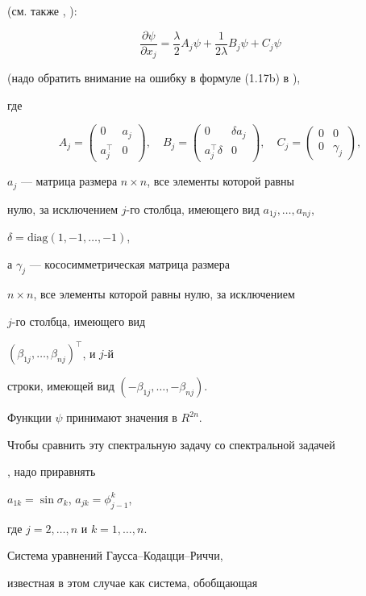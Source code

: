 \cite{ABT} (см. также \cite{Ci-space}, \cite{FP}):


$$


\frac{\partial\psi}{\partial x_j} = \frac{\lambda}{2} A_j \psi


+ \frac{1}{2\lambda} B_j \psi + C_j \psi 


$$


(надо обратить внимание на ошибку в формуле (1.17b) в \cite{ABT}),


где 


$$


A_j = \begin{pmatrix} 0 & a_j \\ a_j^\top & 0 \end{pmatrix}, \quad 


B_j = \begin{pmatrix} 0 & \delta a_j \\ a_j^\top \delta & 0 \end{pmatrix}, \quad


C_j = \begin{pmatrix} 0 & 0 \\ 0 & \gamma_j \end{pmatrix},


$$


$a_j$ --- матрица размера $n\times n$, все элементы которой равны


нулю, за исключением $j$-го столбца, имеющего вид $a_{1j},\dotsc,a_{nj}$,


$\delta = \mathrm{diag}(1,-1,\dotsc,-1)$,


а $\gamma_j$ --- кососимметрическая матрица размера


$n\times n$, все элементы которой равны нулю, за исключением


$j$-го столбца, имеющего вид


$(\beta_{1j},\dotsc,\beta_{nj})^\top$, и $j$-й


строки, имеющей вид $(-\beta_{1j},\dotsc,-\beta_{nj})$.


Функции $\psi$ принимают значения в $R^{2n}$.


Чтобы сравнить эту спектральную задачу со спектральной задачей


, надо приравнять


$a_{1k} = \sin\sigma_k$, $a_{jk} = \phi_{j-1}^k$,


где $j=2,\dotsc,n$ и $k=1,\dotsc,n$.


Система уравнений Гаусса--Кодацци--Риччи,


известная в этом случае как система, обобщающая


